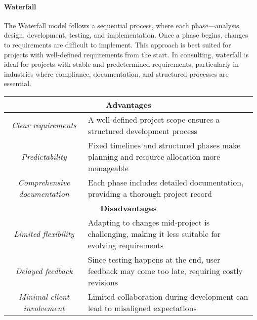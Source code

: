\paragraph*{Waterfall}
The Waterfall model follows a sequential process, where each phase—analysis, design, development, testing, and implementation. 
Once a phase begins, changes to requirements are difficult to implement. 
This approach is best suited for projects with well-defined requirements from the start.
In consulting, waterfall is ideal for projects with stable and predetermined requirements, particularly in industries where compliance, documentation, and structured processes are essential.
\renewcommand*{\arraystretch}{1.5}
\begin{table}[!ht]
    \centering
    \begin{tabular}{|c|p{10cm}|}
    \hline
    \multicolumn{2}{|c|}{\textbf{Advantages}} \\ \hline
    \textit{Clear requirements}              & A well-defined project scope ensures a structured development process  \\ \hline
    \textit{Predictability}                  & Fixed timelines and structured phases make planning and resource allocation more manageable \\ \hline
    \textit{Comprehensive documentation}     & Each phase includes detailed documentation, providing a thorough project record \\ \hline
    \multicolumn{2}{|c|}{\textbf{Disadvantages}} \\ \hline
    \textit{Limited flexibility}             & Adapting to changes mid-project is challenging, making it less suitable for evolving requirements \\ \hline
    \textit{Delayed feedback}                & Since testing happens at the end, user feedback may come too late, requiring costly revisions \\ \hline
    \textit{Minimal client involvement}      & Limited collaboration during development can lead to misaligned expectations \\ \hline
\end{tabular}
\end{table}
\renewcommand*{\arraystretch}{1}

